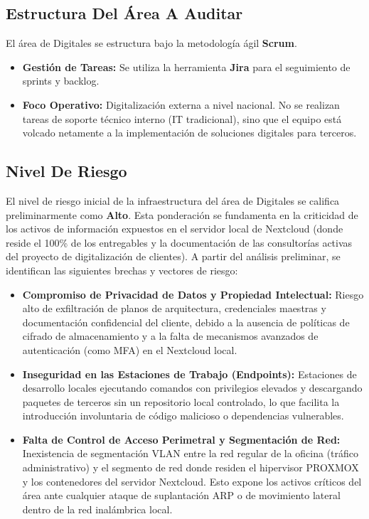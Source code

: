 \documentclass[12pt]{article}
\begin{document}
\subsection{Estructura Del Área A Auditar}
El área de Digitales se estructura bajo la metodología ágil \textbf{Scrum}. 
\begin{itemize}
    \item \textbf{Gestión de Tareas:} Se utiliza la herramienta \textbf{Jira} para el seguimiento de sprints y backlog.
    \item \textbf{Foco Operativo:} Digitalización externa a nivel nacional. No se realizan tareas de soporte técnico interno (IT tradicional), sino que el equipo está volcado netamente a la implementación de soluciones digitales para terceros.
\end{itemize}

\subsection{Nivel De Riesgo}
El nivel de riesgo inicial de la infraestructura del área de Digitales se califica preliminarmente como \textbf{Alto}. Esta ponderación se fundamenta en la criticidad de los activos de información expuestos en el servidor local de Nextcloud (donde reside el 100\% de los entregables y la documentación de las consultorías activas del proyecto de digitalización de clientes). A partir del análisis preliminar, se identifican las siguientes brechas y vectores de riesgo:
\begin{itemize}
    \item \textbf{Compromiso de Privacidad de Datos y Propiedad Intelectual:} Riesgo alto de exfiltración de planos de arquitectura, credenciales maestras y documentación confidencial del cliente, debido a la ausencia de políticas de cifrado de almacenamiento y a la falta de mecanismos avanzados de autenticación (como MFA) en el Nextcloud local.
    \item \textbf{Inseguridad en las Estaciones de Trabajo (Endpoints):} Estaciones de desarrollo locales ejecutando comandos con privilegios elevados y descargando paquetes de terceros sin un repositorio local controlado, lo que facilita la introducción involuntaria de código malicioso o dependencias vulnerables.
    \item \textbf{Falta de Control de Acceso Perimetral y Segmentación de Red:} Inexistencia de segmentación VLAN entre la red regular de la oficina (tráfico administrativo) y el segmento de red donde residen el hipervisor PROXMOX y los contenedores del servidor Nextcloud. Esto expone los activos críticos del área ante cualquier ataque de suplantación ARP o de movimiento lateral dentro de la red inalámbrica local.
\end{itemize}
\end{document}
